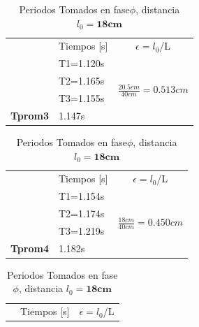 \documentclass{article}
\begin{document}
\begin{table}[H]
\begin{subtable}{.5\linewidth}
\begin{tabular}{@{}l|l|l|@{}}
\cmidrule(l){2-3}
\multicolumn{1}{c|}{} & \multicolumn{1}{c|}{Tiempos [s]} & \multicolumn{1}{c|}{$\epsilon=l_{0}$/L}     \\ \cmidrule(l){2-3} 
                      & T1=1.120s                        & \multirow{4}{*}{$\frac{20.5cm}{40cm}=0.513cm$} \\ \cmidrule(lr){2-2}
                      & T2=1.165s                        &                                \\ \cmidrule(lr){2-2}
                      & T3=1.155s                        &                                \\ \cmidrule(lr){2-2}
\textbf{Tprom3}       & 1.147s                           &                                \\ \cmidrule(l){2-3} 
\end{tabular}
\caption{Periodos Tomados en fase$\phi$, distancia $l_{0}=\textbf{20.5cm}$}
\label{fase1-3}
    \end{subtable}%
    \begin{subtable}{.8\linewidth}
      \centering
        \begin{tabular}{@{}l|l|l|@{}}
		\cmidrule(l){2-3}
\multicolumn{1}{c|}{} & \multicolumn{1}{c|}{Tiempos [s]} & \multicolumn{1}{c|}{$\epsilon=l_{0}$/L}       \\ \cmidrule(l){2-3} 
                      & T1=1.154s                        & \multirow{4}{*}{$\frac{18cm}{40cm}=0.450cm$}  \\ \cmidrule(lr){2-2}
                      & T2=1.174s                        &                                                 \\ \cmidrule(lr){2-2}
                      & T3=1.219s                        &                                  				 \\ \cmidrule(lr){2-2}
	\textbf{Tprom4}   & 1.182s                            &               				                      \\ \cmidrule(l){2-3} 
\end{tabular}
\caption{Periodos Tomados en fase$\phi$, distancia $l_{0}=\textbf{18cm}$}
\label{fase1-4}
    \end{subtable} 
    \begin{subtable}{.5\linewidth}
      \centering
        \begin{tabular}{@{}l|l|l|@{}}
\cmidrule(l){2-3}
\multicolumn{1}{c|}{} & \multicolumn{1}{c|}{Tiempos [s]} & \multicolumn{1}{c|}{$\epsilon=l_{0}$/L}     \\ \cmidrule(l){2-3} 

\end{tabular}
\end{subtable}
\end{table}
\end{document}
